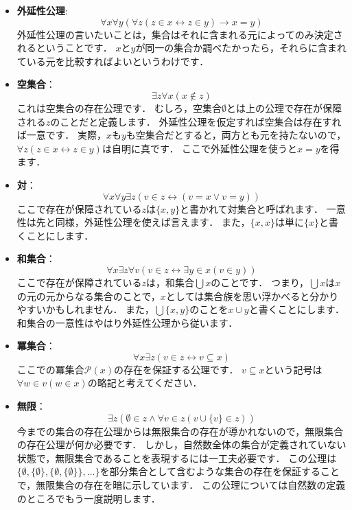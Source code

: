 \documentclass[./main]{subfiles}
\newcommand{\tbf}{\textbf}
\newcommand{\mcl}{\mathcal}
\renewcommand{\subset}{\subseteq}
\begin{document}
\begin{itemize}
\item
\tbf{外延性公理}:
\[
\forall x\forall y(\forall z(z\in x\leftrightarrow z\in y)\to x=y)
\]
外延性公理の言いたいことは，集合はそれに含まれる元によってのみ決定されるということです．
$x$と$y$が同一の集合か調べたかったら，それらに含まれている元を比較すればよいというわけです．

\item
\tbf{空集合}：
\[
\exists z\forall x(x\notin z)
\]
これは空集合の存在公理です．
むしろ，空集合$\emptyset$とは上の公理で存在が保障される$z$のことだと定義します．
外延性公理を仮定すれば空集合は存在すれば一意です．
実際，$x$も$y$も空集合だとすると，両方とも元を持たないので，$\forall z(z\in x\leftrightarrow z\in y)$は自明に真です．
ここで外延性公理を使うと$x=y$を得ます．

\item
\tbf{対}：
\[
\forall x\forall y\exists z(v\in z\leftrightarrow(v=x\vee v=y))
\]
ここで存在が保障されている$z$は$\{x, y\}$と書かれて対集合と呼ばれます．
一意性は先と同様，外延性公理を使えば言えます．
また，$\{x, x\}$は単に$\{x\}$と書くことにします．

\item
\tbf{和集合}：
\[
\forall x\exists z\forall v(v\in z\leftrightarrow\exists y\in x(v\in y))
\]
ここで存在が保障されている$z$は，和集合$\bigcup x$のことです．
つまり，$\bigcup x$は$x$の元の元からなる集合のことで，$x$としては集合族を思い浮かべると分かりやすいかもしれません．
また，$\bigcup\{x,y\}$のことを$x\cup y$と書くことにします．
和集合の一意性はやはり外延性公理から従います．

\item
\tbf{冪集合}：
\[
\forall x\exists z(v\in z\leftrightarrow v\subset x)
\]
ここでの冪集合$\mcl{P}(x)$の存在を保証する公理です．
$v\subset x$という記号は$\forall w\in v(w\in x)$の略記と考えてください．

\item
\tbf{無限}：
\[
\exists z(\emptyset\in z\wedge\forall v\in z(v\cup\{v\}\in z))
\]
今までの集合の存在公理からは無限集合の存在が導かれないので，無限集合の存在公理が何か必要です．
しかし，自然数全体の集合が定義されていない状態で，無限集合であることを表現するには一工夫必要です．
この公理は$\{\emptyset,\{\emptyset\},\{\emptyset,\{\emptyset\}\},\ldots\}$を部分集合として含むような集合の存在を保証することで，無限集合の存在を暗に示しています．
この公理については自然数の定義のところでもう一度説明します．


\end{itemize}
\end{document}
